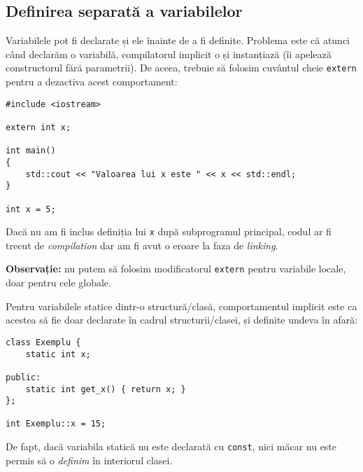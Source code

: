 \subsection*{Definirea separată a variabilelor}

Variabilele pot fi declarate și ele înainte de a fi definite. Problema este că atunci când declarăm o variabilă, compilatorul implicit o și instanțiază (îi apelează constructorul fără parametrii). De aceea, trebuie să folosim cuvântul cheie \texttt{extern} pentru a dezactiva acest comportament:
\begin{lstlisting}
#include <iostream>

extern int x;

int main()
{
    std::cout << "Valoarea lui x este " << x << std::endl;
}

int x = 5;
\end{lstlisting}

Dacă nu am fi inclus definiția lui \texttt{x} după subprogramul principal, codul ar fi trecut de \emph{compilation} dar am fi avut o eroare la faza de \emph{linking}.

\textbf{Observație:} nu putem să folosim modificatorul \texttt{extern} pentru variabile locale, doar pentru cele globale.

Pentru variabilele statice dintr-o structură/clasă, comportamentul implicit este ca acestea să fie doar declarate în cadrul structurii/clasei, și definite undeva în afară:
\begin{lstlisting}
class Exemplu {
    static int x;

public:
    static int get_x() { return x; }
};

int Exemplu::x = 15;
\end{lstlisting}

De fapt, dacă variabila statică nu este declarată cu \texttt{const}, nici măcar nu este permis să o \emph{definim} în interiorul clasei.